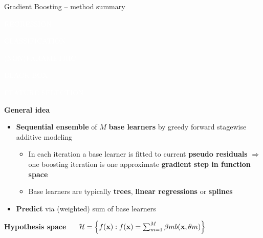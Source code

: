 \documentclass[11pt,compress,t,notes=noshow, xcolor=table]{beamer}
\newcommand{\highlight}[1]{\textcolor{hlcol}{\textbf{#1}}}
\newcommand{\maketag}[2][100]{
  \colorbox{hlcol!#1}{\textcolor{white}{\MakeUppercase{\scriptsize #2}} 
  \vphantom{}}
}
\begin{document}
\begin{frame2}{Gradient Boosting -- method summary}
\maketag{regression} \maketag{classification}
\maketag[50]{(NON)PARAMETRIC}
\maketag{BLACK-BOX}
\maketag{FEATURE SELECTION}

\medskip

\highlight{General idea}

\begin{itemize}
  \item \textbf{Sequential ensemble} of $M$ \textbf{base learners} by greedy forward stagewise additive modeling
  \begin{itemize}
      \item In each iteration a base learner is fitted to current \textbf{pseudo residuals} $\Rightarrow$ one boosting iteration is one approximate \textbf{gradient step in function space}
      \item Base learners are typically \textbf{trees}, \textbf{linear regressions} or \textbf{splines}
  \end{itemize}
  \item \textbf{Predict} via (weighted) sum of base learners
  
\end{itemize}

\medskip

\highlight{Hypothesis space} ~~
$\mathcal{H} = \left\{ f(\mathbf{x}): f(\mathbf{x}) = \sum_{m = 1}^M \beta m b(\mathbf{x}, \theta m) \right\}$


\end{frame2}
\end{document}
